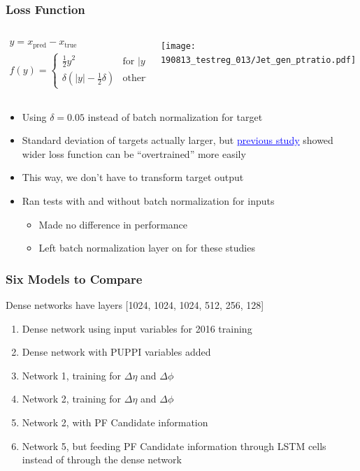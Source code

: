 \documentclass{beamer}
\newcommand{\link}[2]{\href{#2}{\textcolor{blue}{\underline{#1}}}}
\begin{document}
\begin{frame}
  \frametitle{Loss Function}

  \begin{columns}
    \begin{column}{0.5\linewidth}
      \begin{gather*}
        y = x_\mathrm{pred} - x_\mathrm{true} \\
        f(y) = \begin{cases}
          \frac12 y^2 & \mbox{for } |y| < \delta \\
          \delta(|y| - \frac12 \delta) & \mbox{otherwise}
        \end{cases}
      \end{gather*}
    \end{column}
    \begin{column}{0.5\linewidth}
      \texttt{[image: 190813\_testreg\_013/Jet\_gen\_ptratio.pdf]}
    \end{column}
  \end{columns}

  \begin{itemize}
  \item Using $\delta = 0.05$ instead of batch normalization for target
  \item Standard deviation of targets actually larger, but
    \link{previous study}{http://t3serv001.mit.edu/~dabercro/docs/hbb/dabercro_hbb_190611.pdf}
    showed wider loss function can be ``overtrained''
    more easily
  \item This way, we don't have to transform target output
  \item Ran tests with and without batch normalization for inputs
    \begin{itemize}
    \item Made no difference in performance
    \item Left batch normalization layer on for these studies
    \end{itemize}
  \end{itemize}

\end{frame}

\begin{frame}
  \frametitle{Six Models to Compare}

  Dense networks have layers [1024, 1024, 1024, 512, 256, 128]

  \begin{enumerate}
  \item Dense network using input variables for 2016 training
  \item Dense network with PUPPI variables added
  \item Network 1, training for $\Delta \eta$ and $\Delta \phi$
  \item Network 2, training for $\Delta \eta$ and $\Delta \phi$
  \item Network 2, with PF Candidate information
  \item Network 5, but feeding PF Candidate information through LSTM cells
    instead of through the dense network
  \end{enumerate}

\end{frame}
\end{document}
